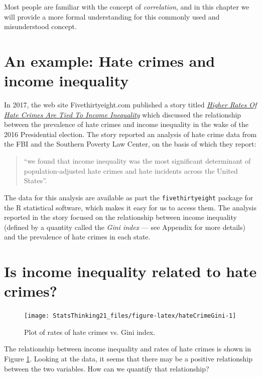 \documentclass[
  12pt,
]{book}
\begin{document}
Most people are familiar with the concept of \emph{correlation}, and in this chapter we will provide a more formal understanding for this commonly used and misunderstood concept.

\hypertarget{an-example-hate-crimes-and-income-inequality}{%
\section{An example: Hate crimes and income inequality}\label{an-example-hate-crimes-and-income-inequality}}

In 2017, the web site Fivethirtyeight.com published a story titled \href{https://fivethirtyeight.com/features/higher-rates-of-hate-crimes-are-tied-to-income-inequality/}{\emph{Higher Rates Of Hate Crimes Are Tied To Income Inequality}} which discussed the relationship between the prevalence of hate crimes and income inequality in the wake of the 2016 Presidential election. The story reported an analysis of hate crime data from the FBI and the Southern Poverty Law Center, on the basis of which they report:

\begin{quote}
``we found that income inequality was the most significant determinant of population-adjusted hate crimes and hate incidents across the United States''.
\end{quote}

The data for this analysis are available as part the \texttt{fivethirtyeight} package for the R statistical software, which makes it easy for us to access them. The analysis reported in the story focused on the relationship between income inequality (defined by a quantity called the \emph{Gini index} --- see Appendix for more details) and the prevalence of hate crimes in each state.

\hypertarget{is-income-inequality-related-to-hate-crimes}{%
\section{Is income inequality related to hate crimes?}\label{is-income-inequality-related-to-hate-crimes}}

\begin{figure}
\texttt{[image: StatsThinking21\_files/figure-latex/hateCrimeGini-1]} \caption{Plot of rates of hate crimes vs. Gini index.}\label{fig:hateCrimeGini}
\end{figure}

The relationship between income inequality and rates of hate crimes is shown in Figure \ref{fig:hateCrimeGini}.
Looking at the data, it seems that there may be a positive relationship between the two variables. How can we quantify that relationship?
\end{document}
